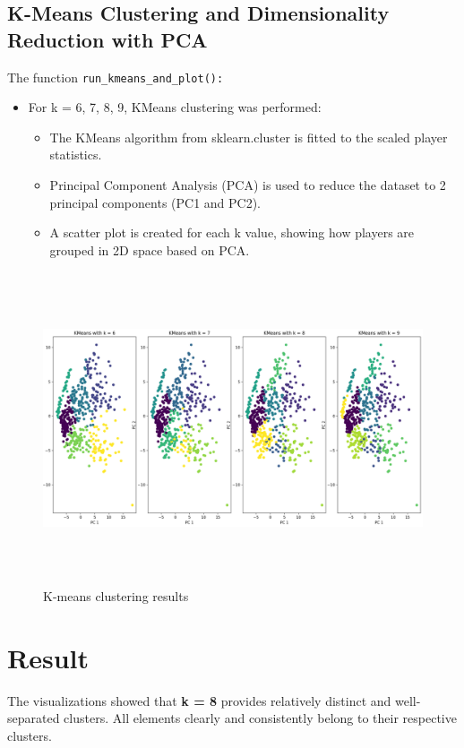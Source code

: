 \documentclass[12pt,a4paper]{report}
\begin{document}
\subsection{K-Means Clustering and Dimensionality Reduction with PCA}
The function \texttt{run\_kmeans\_and\_plot():}
\begin{itemize}
    \item For k = 6, 7, 8, 9, KMeans clustering was performed:
    \begin{itemize}
        \item The KMeans algorithm from sklearn.cluster is fitted to the scaled player statistics.
        \item Principal Component Analysis (PCA) is used to reduce the dataset to 2 principal components (PC1 and PC2).
        \item A scatter plot is created for each k value, showing how players are grouped in 2D space based on PCA.
    \end{itemize}
\end{itemize}

\begin{figure}[H]
    \centering
    \includegraphics[width=6.5in,height=3.625in]{media/image13.png}
    \caption{K-means clustering results}
\end{figure}

\section{Result}
The visualizations showed that \textbf{k = 8} provides relatively distinct and well-separated clusters. All elements clearly and consistently belong to their respective clusters.
\end{document}
